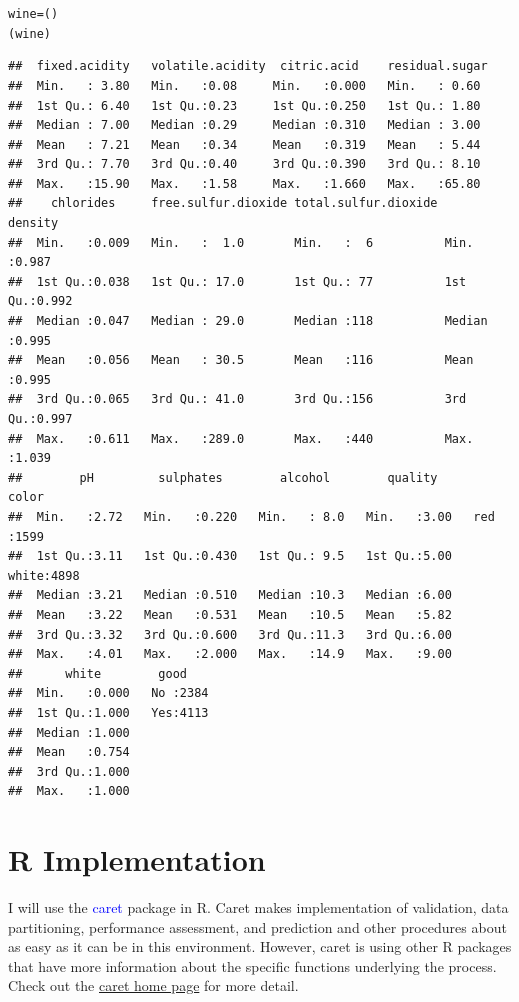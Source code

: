 \begin{knitrout}\footnotesize
{}\color{fgcolor}\begin{kframe}
\begin{alltt}
wine = ()
(wine)
\end{alltt}
\begin{verbatim}
##  fixed.acidity   volatile.acidity  citric.acid    residual.sugar 
##  Min.   : 3.80   Min.   :0.08     Min.   :0.000   Min.   : 0.60  
##  1st Qu.: 6.40   1st Qu.:0.23     1st Qu.:0.250   1st Qu.: 1.80  
##  Median : 7.00   Median :0.29     Median :0.310   Median : 3.00  
##  Mean   : 7.21   Mean   :0.34     Mean   :0.319   Mean   : 5.44  
##  3rd Qu.: 7.70   3rd Qu.:0.40     3rd Qu.:0.390   3rd Qu.: 8.10  
##  Max.   :15.90   Max.   :1.58     Max.   :1.660   Max.   :65.80  
##    chlorides     free.sulfur.dioxide total.sulfur.dioxide    density     
##  Min.   :0.009   Min.   :  1.0       Min.   :  6          Min.   :0.987  
##  1st Qu.:0.038   1st Qu.: 17.0       1st Qu.: 77          1st Qu.:0.992  
##  Median :0.047   Median : 29.0       Median :118          Median :0.995  
##  Mean   :0.056   Mean   : 30.5       Mean   :116          Mean   :0.995  
##  3rd Qu.:0.065   3rd Qu.: 41.0       3rd Qu.:156          3rd Qu.:0.997  
##  Max.   :0.611   Max.   :289.0       Max.   :440          Max.   :1.039  
##        pH         sulphates        alcohol        quality       color     
##  Min.   :2.72   Min.   :0.220   Min.   : 8.0   Min.   :3.00   red  :1599  
##  1st Qu.:3.11   1st Qu.:0.430   1st Qu.: 9.5   1st Qu.:5.00   white:4898  
##  Median :3.21   Median :0.510   Median :10.3   Median :6.00               
##  Mean   :3.22   Mean   :0.531   Mean   :10.5   Mean   :5.82               
##  3rd Qu.:3.32   3rd Qu.:0.600   3rd Qu.:11.3   3rd Qu.:6.00               
##  Max.   :4.01   Max.   :2.000   Max.   :14.9   Max.   :9.00               
##      white        good     
##  Min.   :0.000   No :2384  
##  1st Qu.:1.000   Yes:4113  
##  Median :1.000             
##  Mean   :0.754             
##  3rd Qu.:1.000             
##  Max.   :1.000
\end{verbatim}
\end{kframe}
\end{knitrout}



\section{R Implementation}
I will use the \textcolor{blue}{caret} package in R.  Caret makes implementation of validation, data partitioning, performance assessment, and prediction and other procedures about as easy as it can be in this environment.  However, caret is using other R packages that have more information about the specific functions underlying the process.  Check out the \href{http://caret.r-forge.r-project.org/}{caret home page} for more detail.

